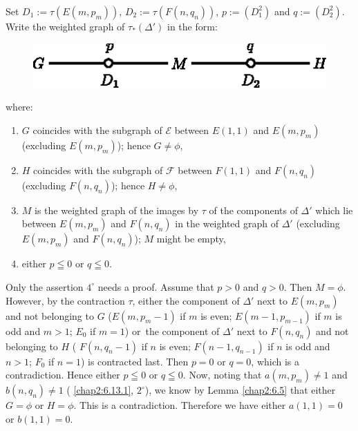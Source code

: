 \subsubsection{}\label{chap2:6.13.2}
Set $D_{1}:=\tau(E(m,p_{m}))$, $D_{2}:=\tau(F(n,q_{n}))$,
$p:=(D^{2}_{1})$ and $q:=(D^{2}_{2})$. Write the weighted graph of
$\tau_{\ast}(\Delta')$ in the form:
\begin{figure}[H]
\centering
\includegraphics[scale=1.1]{figures/chap2-fig31.eps}
\end{figure}
\noindent
where:
\begin{enumerate}
\renewcommand{\labelenumi}{\theenumi$^{\circ}$}
\item $G$ coincides with the subgraph of $\mathscr{E}$ between
  $E(1,1)$ and $E(m,p_{m})$ (excluding $E(m,p_{m})$); hence $G\neq \phi$,

\item $H$ coincides with the subgraph of $\mathscr{F}$ between
  $F(1,1)$ and $F(n,q_{n})$ (excluding $F(n,q_{n})$); hence $H\neq
  \phi$,

\item $M$ is the weighted graph of the images by $\tau$ of the
  components of $\Delta'$ which lie between $E(m,p_{m})$ and
  $F(n,q_{n})$ in the weighted graph of $\Delta'$ (excluding
  $E(m,p_{m})$ and $F(n,q_{n})$); $M$ might be empty,

\item either $p\leqq 0$ or $q\leqq 0$.
\end{enumerate}
Only the assertion $4^{\circ}$ needs a proof. Assume that $p>0$ and
$q>0$. Then $M=\phi$. However, by the contraction $\tau$, either the
component of $\Delta'$ next to $E(m,p_{m})$ and not belonging to $G$
(\iec $E(m,p_{m}-1)$ if $m$ is even; $E(m-1,p_{m-1})$ if $m$ is odd
and $m>1$; $E_{0}$ if $m=1$) or\pageoriginale\ the component of
$\Delta'$ next to $F(n,q_{n})$ and not belonging to $H$ (\iec
$F(n,q_{n}-1)$ if $n$ is even; $F(n-1,q_{n-1})$ if $n$ is odd and
$n>1$; $F_{0}$ if $n=1$) is contracted last. Then $p=0$ or $q=0$,
which is a contradiction. Hence either $p\leqq 0$ or $q\leqq 0$. Now,
noting that $a(m,p_{m})\neq 1$ and $b(n,q_{n})\neq 1$ (\cf
\ref{chap2:6.13.1}, $2^{\circ}$), we know by Lemma \ref{chap2:6.5} that either
$G=\phi$ or $H=\phi$. This is a contradiction. Therefore we have
either $a(1,1)=0$ or $b(1,1)=0$.


